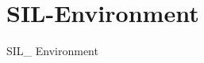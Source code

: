 \chapter{SIL-\/\+Environment}
\hypertarget{md__r_e_a_d_m_e}{}\label{md__r_e_a_d_m_e}
\label{md__r_e_a_d_m_e_autotoc_md0}%
%


SIL\+\_\+ Environment 